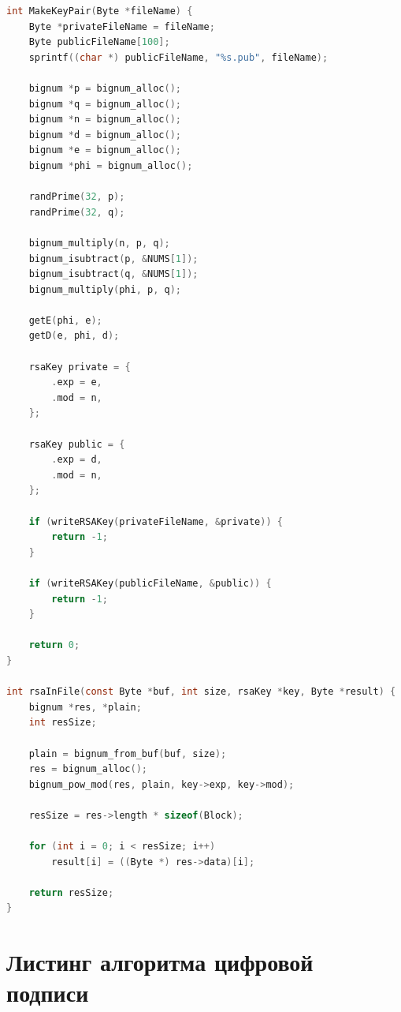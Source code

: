 \begin{lstlisting}[language=C, label=lst:rsa, caption={Реализация алгоритма RSA}]
int MakeKeyPair(Byte *fileName) {
    Byte *privateFileName = fileName;
    Byte publicFileName[100];
    sprintf((char *) publicFileName, "%s.pub", fileName);

    bignum *p = bignum_alloc();
    bignum *q = bignum_alloc();
    bignum *n = bignum_alloc();
    bignum *d = bignum_alloc();
    bignum *e = bignum_alloc();
    bignum *phi = bignum_alloc();

    randPrime(32, p);
    randPrime(32, q);

    bignum_multiply(n, p, q);
    bignum_isubtract(p, &NUMS[1]);
    bignum_isubtract(q, &NUMS[1]);
    bignum_multiply(phi, p, q);

    getE(phi, e);
    getD(e, phi, d);

    rsaKey private = {
        .exp = e,
        .mod = n,
    };

    rsaKey public = {
        .exp = d,
        .mod = n,
    };

    if (writeRSAKey(privateFileName, &private)) {
        return -1;
    }

    if (writeRSAKey(publicFileName, &public)) {
        return -1;
    }

    return 0;
}

int rsaInFile(const Byte *buf, int size, rsaKey *key, Byte *result) {
    bignum *res, *plain;
    int resSize;

    plain = bignum_from_buf(buf, size);
    res = bignum_alloc();
    bignum_pow_mod(res, plain, key->exp, key->mod);

    resSize = res->length * sizeof(Block);

    for (int i = 0; i < resSize; i++)
        result[i] = ((Byte *) res->data)[i];

    return resSize;
}
\end{lstlisting}


\section{Листинг алгоритма цифровой подписи}

